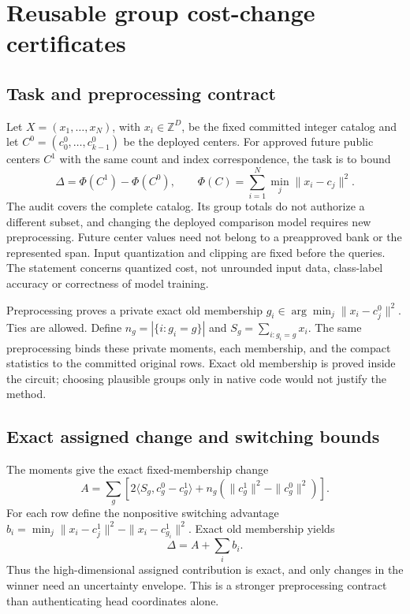 \section{Reusable group cost-change certificates}\label{sec:group-design}
\subsection{Task and preprocessing contract}
Let $X=(x_1,\ldots,x_N)$, with $x_i\in\mathbb Z^D$, be the fixed committed
integer catalog and let
$C^0=(c^0_0,\ldots,c^0_{k-1})$ be the deployed centers. For approved future
public centers $C^1$ with the same count and index correspondence, the task is
to bound
\begin{equation}
 \Delta=\Phi(C^1)-\Phi(C^0),\qquad
 \Phi(C)=\sum_{i=1}^{N}\min_j\|x_i-c_j\|^2.
\end{equation}
The audit covers the complete catalog. Its group totals do not authorize a
different subset, and changing the deployed comparison model requires new
preprocessing. Future center values need not belong to a preapproved bank or
the represented span. Input quantization and clipping are fixed before the
queries. The statement concerns quantized cost, not unrounded input data,
class-label accuracy or correctness of model training.

Preprocessing proves a private exact old membership
$g_i\in\arg\min_j\|x_i-c^0_j\|^2$. Ties are allowed. Define
$n_g=|\{i:g_i=g\}|$ and $S_g=\sum_{i:g_i=g}x_i$. The same preprocessing binds
these private moments, each membership, and the compact statistics to the
committed original rows. Exact old membership is proved inside the circuit;
choosing plausible groups only in native code would not justify the method.

\subsection{Exact assigned change and switching bounds}
The moments give the exact fixed-membership change
\begin{equation}\label{eq:group-assigned-change}
 A=\sum_g\left[2\langle S_g,c^0_g-c^1_g\rangle+
 n_g(\|c^1_g\|^2-\|c^0_g\|^2)\right].
\end{equation}
For each row define the nonpositive switching advantage
$b_i=\min_j\|x_i-c^1_j\|^2-\|x_i-c^1_{g_i}\|^2$. Exact old membership yields
\begin{equation}\label{eq:group-change-identity}
 \Delta=A+\sum_i b_i.
\end{equation}
Thus the high-dimensional assigned contribution is exact, and only changes
in the winner need an uncertainty envelope. This is a stronger preprocessing
contract than authenticating head coordinates alone.

